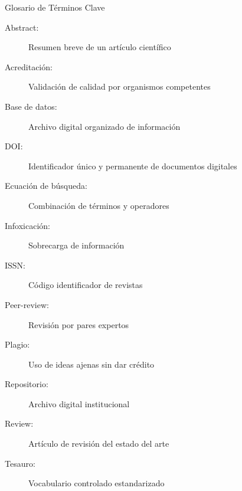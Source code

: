 \documentclass[11pt,aspectratio=169]{beamer}
\begin{document}
\begin{frame}{Glosario de Términos Clave}
	\small
	\begin{description}
		\item[Abstract:] Resumen breve de un artículo científico
		\item[Acreditación:] Validación de calidad por organismos competentes
		\item[Base de datos:] Archivo digital organizado de información
		\item[DOI:] Identificador único y permanente de documentos digitales
		\item[Ecuación de búsqueda:] Combinación de términos y operadores
		\item[Infoxicación:] Sobrecarga de información
		\item[ISSN:] Código identificador de revistas
		\item[Peer-review:] Revisión por pares expertos
		\item[Plagio:] Uso de ideas ajenas sin dar crédito
		\item[Repositorio:] Archivo digital institucional
		\item[Review:] Artículo de revisión del estado del arte
		\item[Tesauro:] Vocabulario controlado estandarizado
	\end{description}
\end{frame}

\end{document}
